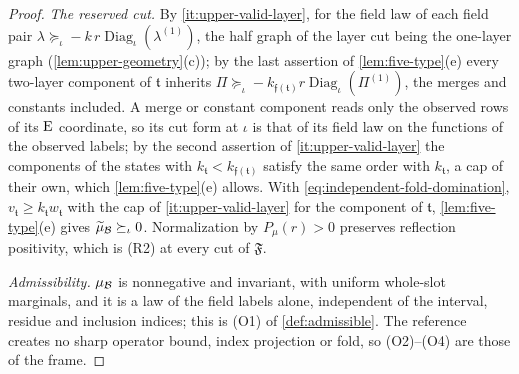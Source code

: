 \begin{proof}
\emph{The reserved cut.} By \ref{it:upper-valid-layer}, for the field law of each field
pair $\lambda\succeq_\iota-k\,r\operatorname{Diag}_\iota(\lambda^{(1)})$, the half graph of
the layer cut being the one-layer graph (\cref{lem:upper-geometry}(c)); by the last
assertion of \cref{lem:five-type}(e) every two-layer component of $\mathfrak t$ inherits
$\Pi\succeq_\iota-k_{\mathfrak f(\mathfrak t)}r\operatorname{Diag}_\iota(\Pi^{(1)})$, the
merges and constants included. A merge or constant component reads only the observed
rows of its $\rm E$ coordinate, so its cut form at $\iota$ is that of its field law on
the functions of the observed labels; by the second assertion of
\ref{it:upper-valid-layer} the components of the states with
$k_{\mathfrak t}<k_{\mathfrak f(\mathfrak t)}$ satisfy the same order with $k_{\mathfrak t}$,
a cap of their own, which \cref{lem:five-type}(e) allows. With
\eqref{eq:independent-fold-domination}, $v_{\mathfrak t}\ge k_{\mathfrak t}w_{\mathfrak t}$
with the cap of \ref{it:upper-valid-layer} for the component of $\mathfrak t$,
\cref{lem:five-type}(e) gives $\widetilde\mu_\mathcal B\succeq_\iota0$. Normalization by
$P_\mu(r)>0$ preserves reflection positivity, which is (R2) at every cut of $\mathfrak F$.

\emph{Admissibility.} $\mu_\mathcal B$ is nonnegative and invariant, with uniform whole-slot
marginals, and it is a law of the field labels alone, independent of the interval,
residue and inclusion indices; this is (O1) of \cref{def:admissible}. The reference
creates no sharp operator bound, index projection or fold, so (O2)--(O4) are those of
the frame.


\end{proof}
